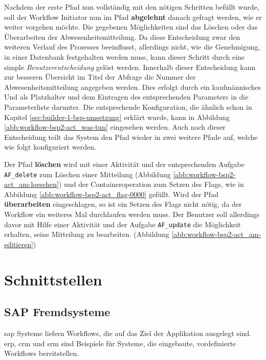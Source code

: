 Nachdem der erste Pfad nun vollständig mit den nötigen Schritten befüllt wurde, soll der Workflow Initiator nun im Pfad \textbf{abgelehnt} danach gefragt werden, wie er weiter vorgehen möchte. Die gegebenen Möglichkeiten sind das Löschen oder das Überarbeiten der Abwesenheitsmitteilung. Da diese Entscheidung zwar den weiteren Verlauf des Prozesses beeinflusst, allerdings nicht, wie die Genehmigung, in einer Datenbank festgehalten werden muss, kann dieser Schritt durch eine simple \textit{Benutzerentscheidung} gelöst werden. Innerhalb dieser Entscheidung kann zur besseren Übersicht im Titel der Abfrage die Nummer der Abwesenheitsmitteilung angegeben werden. Dies erfolgt durch ein kaufmännisches Und als Platzhalter und dem Eintragen des entsprechenden Parameters in die Parameterliste darunter. Die entsprechende Konfiguration, die ähnlich schon in Kapitel \ref{sec:builder-1-bsp-umsetzung} erklärt wurde, kann in Abbildung \ref{abb:workflow-bsp2-act_was-tun} eingesehen werden. Auch nach dieser Entscheidung teilt das System den Pfad wieder in zwei weitere Pfade auf, welche wie folgt konfiguriert werden.

Der Pfad \textbf{löschen} wird mit einer Aktivität und der entsprechenden Aufgabe \texttt{AF\_delete} zum Löschen einer Mitteilung (Abbildung \ref{abb:workflow-bsp2-act_am-loeschen}) und der Containeroperation zum Setzen des Flags, wie in Abbildung \ref{abb:workflow-bsp2-act_flag-0000} gefüllt. Wird der Pfad \textbf{überarbeiten} eingeschlagen, so ist ein Setzen des Flags nicht nötig, da der Workflow ein weiteres Mal durchlaufen werden muss. Der Benutzer soll allerdings davor mit Hilfe einer Aktivität und der Aufgabe \texttt{AF\_update} die Möglichkeit erhalten, seine Mitteilung zu bearbeiten. (Abbildung \ref{abb:workflow-bsp2-act_am-editieren})

\section{Schnittstellen}

\subsection{SAP Fremdsysteme}
\label{sec:export-sap}

\gls{sap} Systeme liefern Workflows, die auf das Ziel der Applikation ausgelegt sind. \gls{erp}, \gls{crm} und \gls{srm} sind Beispiele für Systeme, die eingebaute, vordefinierte Workflows bereitstellen. 

